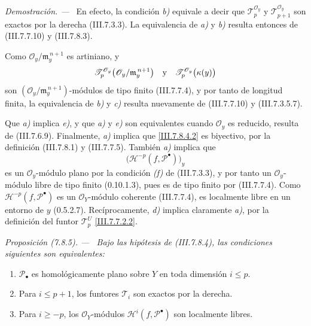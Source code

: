 \documentclass[10pt,oneside]{book}
\newcommand{\kres}{\kappa}
\newcommand{\sref}[2][]{\textup{(#2)}}
\newcommand{\oldpage}[2][]{\setcounter{footnote}{0}\marginpar{\scriptsize\textbf{#1}~|~#2}\ignorespaces}
\newenvironment{proposition}[1][]{\par\medskip\noindent\itshape Proposición (#1). ---\ }{\par}
\newenvironment{proof}{\par\medskip\noindent\textit{Demostración. ---\ }}{\par}
\providecommand{\setmin}{-}%
\begin{document}
\oldpage[III]{206}
\begin{proof}
En efecto, la condición \emph{b)} equivale a decir que
$\mathscr T_p^{\mathscr O_y}$ y $\mathscr T_{p+1}^{\mathscr O_y}$
son exactos por la derecha \sref{III.7.3.3}. La equivalencia de \emph{a)}
y \emph{b)} resulta entonces de \sref{III.7.7.10} y \sref{III.7.8.3}.

Como $\mathscr O_y/\mathfrak m_y^{\,n+1}$ es artiniano, y
\[
  \mathscr T_p^{\mathscr O_y}
    \bigl(\mathscr O_y/\mathfrak m_y^{\,n+1}\bigr)
  \quad\hbox{y}\quad
  \mathscr T_p^{\mathscr O_y}\bigl(\kres(y)\bigr)
\]
son $(\mathscr O_y/\mathfrak m_y^{\,n+1})$-módulos de tipo finito
\sref{III.7.7.4}, y por tanto de longitud finita, la equivalencia de
\emph{b)} y \emph{c)} resulta nuevamente de \sref{III.7.7.10} y
\sref{III.7.3.5.7}.

Que \emph{a)} implica \emph{e)}, y que \emph{a)} y \emph{e)} son equivalentes cuando
$\mathscr O_y$ es reducido, resulta de \sref{III.7.6.9}.
Finalmente, \emph{a)} implica que \eqref{III.7.8.4.2} es biyectivo, por la
definición \sref{III.7.8.1} y \sref{III.7.7.5}. También \emph{a)} implica que
\[
  \bigl(\mathcal H^{-p}(f,\mathscr P^\bullet)\bigr)_y
\]
es un $\mathscr O_y$-módulo plano por la condición \emph{(f)} de
\sref{III.7.3.3}, y por tanto un $\mathscr O_y$-módulo libre de
tipo finito \sref[0]{0.10.1.3}, pues es de tipo finito por
\sref{III.7.7.4}. Como $\mathcal H^{-p}(f,\mathscr P^\bullet)$ es
un $\mathscr O_Y$-módulo coherente \sref{III.7.7.4}, es localmente
libre en un entorno de $y$ \sref[0]{0.5.2.7}. Recíprocamente, \emph{d)}
implica claramente \emph{a)}, por la definición del funtor
$\mathscr T_p^U$ \eqref{III.7.7.2.2}.
\end{proof}

\begin{proposition}[7.8.5]
\label{III.7.8.5}
Bajo las hipótesis de \textup{\sref{III.7.8.4}}, las condiciones siguientes
son equivalentes:
\begin{enumerate}
  \item[\textup{a)}] $\mathscr P_\bullet$ es homológicamente plano sobre $Y$
    en toda dimensión $i\leq p$.
  \item[\textup{b)}] Para $i\leq p+1$, los funtores $\mathscr T_i$ son
    exactos por la derecha.
  \item[\textup{c)}] Para $i\geq\setmin p$, los $\mathscr O_Y$-módulos
    $\mathcal H^i(f,\mathscr P^\bullet)$ son localmente libres.
\end{enumerate}
\end{proposition}
\end{document}
